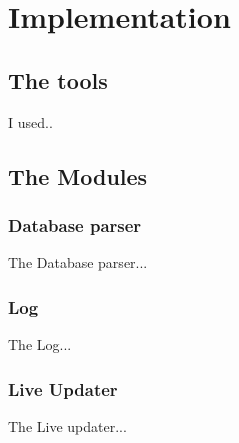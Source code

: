 \section{Implementation}
\label{sec:implementation}

\subsection{The tools}
\label{subsec:the_tools}

I used..


\subsection{The Modules}
\label{subsec:the_modules}

\subsubsection{Database parser}
\label{subsubsec:database_parser}

The Database parser...

\subsubsection{Log}
\label{subsubsec:log}

The Log...

\subsubsection{Live Updater}
\label{subsubsec:Live Updater}

The Live updater...